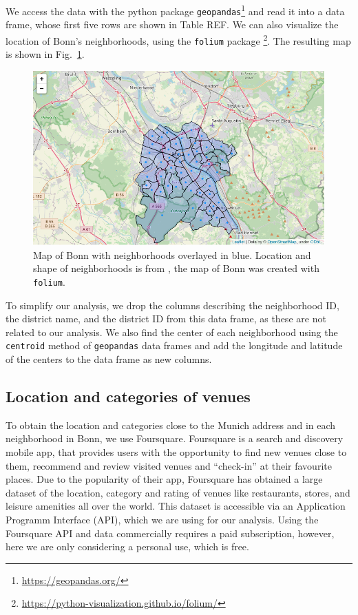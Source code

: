 \documentclass[UKenglish]{scrreprt}
\begin{document}
We access the data with the python package \verb|geopandas|\footnote{\href{https://geopandas.org/}{https://geopandas.org/}} and read it into a data frame, whose first five rows are shown in Table REF. We can also visualize the location of Bonn's neighborhoods, using the \verb|folium| package \footnote{\href{https://python-visualization.github.io/folium/}{https://python-visualization.github.io/folium/}}. The resulting map is shown in Fig.~\ref{fig:map neighborhoods}.

\begin{figure}[htbp]
	\centering
	\includegraphics[width=\textwidth]{Figs/Map_Neighborhoods.png}
	\caption{Map of Bonn with neighborhoods overlayed in blue. Location and shape of neighborhoods is from \cite{Ortsteile}, the map of Bonn was created with \texttt{folium}.}
	\label{fig:map neighborhoods}
\end{figure}

To simplify our analysis, we drop the columns describing the neighborhood ID, the district name, and the district ID from this data frame, as these are not related to our analysis. We also find the center of each neighborhood using the \verb|centroid| method of \verb|geopandas| data frames and add the longitude and latitude of the centers to the data frame as new columns.

\subsection{Location and categories of venues}
To obtain the location and categories close to the Munich address and in each neighborhood in Bonn, we use Foursquare. 
Foursquare is a search and discovery mobile app, that provides users with the opportunity to find new venues close to them, recommend and review visited venues and \enquote{check-in} at their favourite places. Due to the popularity of their app, Foursquare has obtained a large dataset of the location, category and rating of venues like restaurants, stores, and leisure amenities all over the world. This dataset is accessible via an Application Programm Interface (API), which we are using for our analysis.
Using the Foursquare API and data commercially requires a paid subscription, however, here we are only considering a personal use, which is free. 
\end{document}
